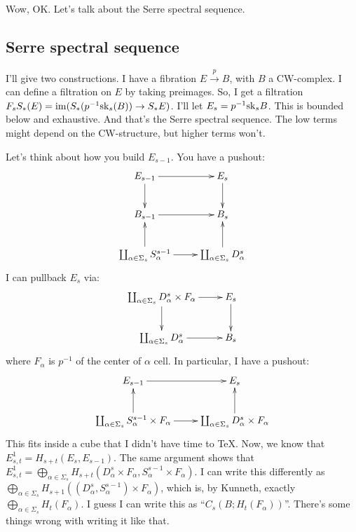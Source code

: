 Wow, OK.
Let's talk about the Serre spectral sequence.
\subsection{Serre spectral sequence}
I'll give two constructions.
I have a fibration $E\xrightarrow{p} B$, with $B$ a CW-complex.
I can define a filtration on $E$ by taking preimages.
So, I get a filtration $F_s S_\ast (E) = \operatorname{im}(S_\ast(p^{-1} \mathrm{sk}_s(B)) \to S_\ast E)$.
I'll let $E_s = p^{-1} \mathrm{sk}_s B$.
This is bounded below and exhaustive.
And that's the Serre spectral sequence.
The low terms might depend on the CW-structure, but higher terms won't.

Let's think about how you build $E_{s-1}$.
You have a pushout:
\begin{equation*}
    \xymatrix{
	E_{s-1}\ar[r]\ar[d] & E_s\ar[d]\\
	B_{s-1}\ar[r] & B_s\\
	\coprod_{\alpha\in\Sigma_s}S^{s-1}_\alpha\ar[r]\ar[u] & \coprod_{\alpha\in\Sigma_s} D^s_\alpha\ar[u]
    }
\end{equation*}
I can pullback $E_s$ via:
\begin{equation*}
    \xymatrix{
	\coprod_{\alpha\in \Sigma_s} D^s_\alpha\times F_\alpha\ar[r]\ar[d] & E_s\ar[d]\\
	\coprod_{\alpha\in \Sigma_s} D^s_\alpha\ar[r] & B_s
    }
\end{equation*}
where $F_\alpha$ is $p^{-1}$ of the center of $\alpha$ cell.
In particular, I have a pushout:
\begin{equation*}
    \xymatrix{
	E_{s-1}\ar[r] & E_s\\
	\coprod_{\alpha\in\Sigma_s} S^{s-1}_\alpha\times F_\alpha\ar[r]\ar[u] & \coprod_{\alpha\in\Sigma_s} D^s_\alpha \times F_\alpha\ar[u]
    }
\end{equation*}
This fits inside a cube that I didn't have time to \TeX.
Now, we know that $E^1_{s,t} = H_{s+t}(E_s,E_{s-1})$.
The same argument shows that $E^1_{s,t} = \bigoplus_{\alpha\in \Sigma_s} H_{s+t}(D^s_\alpha\times F_\alpha, S^{s-1}_\alpha\times F_\alpha)$.
I can write this differently as $\bigoplus_{\alpha\in\Sigma_s} H_{s+1}((D^s_\alpha, S^{s-1}_\alpha)\times F_\alpha)$, which is, by Kunneth, exactly $\bigoplus_{\alpha\in\Sigma_s} H_t(F_\alpha)$.
I guess I can write this as ``$C_s(B;H_t(F_\alpha))$''.
There's some things wrong with writing it like that.

